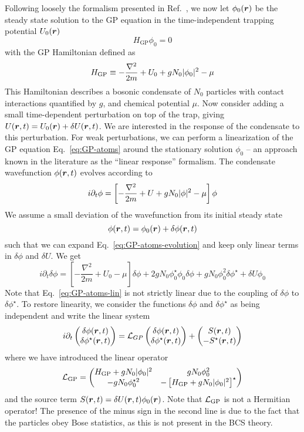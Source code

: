 Following loosely the formalism presented in Ref.~\cite{9783540410478}, we now let $\phi_0(\bm{r})$ be the steady state solution to the GP equation in
the time-independent trapping potential $U_0(\bm{r})$
%
\begin{equation}\label{eq:GP-atoms}
  H_{\text{GP}} \phi_0 = 0
\end{equation}
% 
with the GP Hamiltonian defined as
%
\begin{equation}\label{eq:GP-ham}
  H_{\text{GP}} \equiv -\frac{\nabla^2}{2m} + U_0 + gN_0\vert \phi_0 \vert^2 - \mu
\end{equation}
% 
This Hamiltonian describes a bosonic condensate of $N_0$ particles
with contact interactions quantified by $g$, and chemical potential
$\mu$.  Now consider adding a small time-dependent perturbation on top
of the trap, giving $U(\bm{r},t)=U_0(\bm{r}) + \delta U(\bm{r},t)$. We are
interested in the response of the condensate to this perturbation.
For weak perturbations, we can perform a linearization of the GP
equation Eq.~\eqref{eq:GP-atoms} around the stationary solution
$\phi_0$ -- an approach known in the literature as the ``linear
response'' formalism. The condensate wavefunction $\phi(\bm{r},t)$
evolves according to
%
\begin{equation}\label{eq:GP-atoms-evolution}
  i\partial_t \phi = \left[-\frac{\nabla^2}{2m} + U + gN_0 \vert \phi \vert^2 - \mu\right] \phi
\end{equation}
% 
We assume a small deviation of the wavefunction from its initial
steady state
%
\begin{equation}\label{eq:ansatz-atoms}
  \phi(\bm{r},t) = \phi_0(\bm{r}) + \delta\phi(\bm{r},t)
\end{equation}
% 
such that we can expand Eq.~\eqref{eq:GP-atoms-evolution} and keep only linear terms in $\delta\phi$ and $\delta U$. We get
%
\begin{equation}\label{eq:GP-atoms-lin}
  i\partial_t\delta\phi =  \left[-\frac{\nabla^2}{2m} + U_0-\mu\right]
  \delta\phi + 2 g N_0 \phi_0^{\star}\phi_0\delta\phi + gN_0\phi_0^2\delta\phi^{\star}
  +\delta U\phi_0
\end{equation}
% 
Note that Eq.~\eqref{eq:GP-atoms-lin} is not strictly linear due to
the coupling of $\delta\phi$ to $\delta\phi^{\star}$. To restore
linearity, we consider the functions $\delta\phi$ and
$\delta\phi^{\star}$ as being independent and write the linear system
%
\begin{equation}\label{eq:GP-atoms-system}
  i \partial_t \begin{pmatrix} \delta\phi(\bm{r},t)\\ \delta\phi^{\star}(\bm{r},t) \end{pmatrix}
  = \mathcal{L}_{GP} \begin{pmatrix} \delta\phi(\bm{r},t)\\ \delta\phi^{\star}(\bm{r},t) \end{pmatrix}
  + \begin{pmatrix} S(\bm{r},t)\\ -S^{\star}(\bm{r},t) \end{pmatrix}
\end{equation}
% 
where we have introduced the linear operator
%
\begin{equation}\label{eq:LGP}
  \mathcal{L}_{\text{GP}} = \begin{pmatrix} H_{\text{GP}}+gN_0\vert \phi_0 \vert^2 & g N_0 \phi_0^2\\ -g N_0 \phi_0^{\star 2} & -\left[H_{\text{GP}}+gN_0\vert \phi_0 \vert^2\right]^{\star} \end{pmatrix}
\end{equation}
% 
and the source term $S(\bm{r},t)=\delta U(\bm{r},t)\phi_0(\bm{r})$.  Note that
$\mathcal{L}_{\text{GP}}$ is not a Hermitian operator! The presence of the minus
sign in the second line is due to the fact that the particles obey
Bose statistics, as this is not present in the BCS theory.

